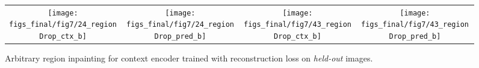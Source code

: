 \documentclass[10pt,twocolumn,letterpaper]{article}
\newcommand{\lblfig}[1]{\label{fig:#1}}
\begin{document}
\begin{figure}[b]
\vspace{-0.5em}
\centering
\begin{tabular}{c@{\hskip 1pt}c@{\hskip 4pt}c@{\hskip 1pt}c}
\texttt{[image: figs\_final/fig7/24\_regionDrop\_ctx\_b]} &
\texttt{[image: figs\_final/fig7/24\_regionDrop\_pred\_b]} &
\texttt{[image: figs\_final/fig7/43\_regionDrop\_ctx\_b]} &
\texttt{[image: figs\_final/fig7/43\_regionDrop\_pred\_b]}
\end{tabular}
\vspace{-0.5em}
\caption{Arbitrary region inpainting for context encoder trained with reconstruction loss on \textit{held-out} images.}
\lblfig{arbitrary_inpaint}
\vspace{-0.5em}
\end{figure}
\end{document}
